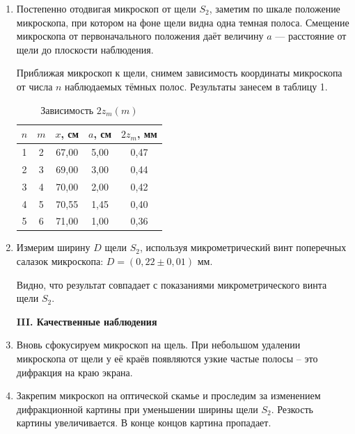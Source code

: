 \documentclass[a4paper,12pt]{article} %
\begin{document}
\begin{enumerate}
		\item Постепенно отодвигая микроскоп от щели $S_2$, заметим по шкале положение микроскопа, при котором на фоне щели видна одна темная полоса. Смещение микроскопа от первоначального положения даёт величину $a$ — расстояние от щели до плоскости наблюдения.
		
		Приближая микроскоп к щели, снимем зависимость координаты микроскопа от числа $n$ наблюдаемых тёмных полос. Результаты занесем в таблицу 1.
		
		\begin{table}[h!]
			\centering
			\begin{tabular}{|c|c|c|c|c|}
				\hline
				$n$ & $m$ & $x$, см & $a$, см & \multicolumn{1}{c|}{$2z_m$, мм} \\ \hline
				1   & 2   & 67,00   & 5,00    & 0,47                            \\ \hline
				2   & 3   & 69,00   & 3,00    & 0,44                            \\ \hline
				3   & 4   & 70,00   & 2,00    & 0,42                            \\ \hline
				4   & 5   & 70,55   & 1,45    & 0,40                            \\ \hline
				5   & 6   & 71,00   & 1,00    & 0,36                            \\ \hline
			\end{tabular}
		\caption{Зависимость $2z_m(m)$}
		\end{table}
	
		\item Измерим ширину $D$ щели $S_2$, используя микрометрический винт поперечных салазок микроскопа: $D = (0,22 \pm 0,01)$ мм.
		
		Видно, что результат совпадает с показаниями микрометрического винта щели $S_2$.
		
		
		\begin{center}
			\textbf{III. Качественные наблюдения}
		\end{center}
		
		\item Вновь сфокусируем микроскоп на щель. При небольшом удалении микроскопа от щели у её краёв появляются узкие частые полосы -- это дифракция на краю экрана.
		
		\item Закрепим микроскоп на оптической скамье и проследим за изменением дифракционной картины при уменьшении ширины щели $S_2$. Резкость картины увеличивается. В конце концов картина пропадает.
		

\end{enumerate}
\end{document}
